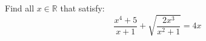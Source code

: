 Find all $x \in \mathbb{R}$ that satisfy:
\begin{equation*}
  \frac{x^4 + 5}{x + 1} + \sqrt{\frac{2 x^3}{x^2 + 1}} = 4x
\end{equation*}
